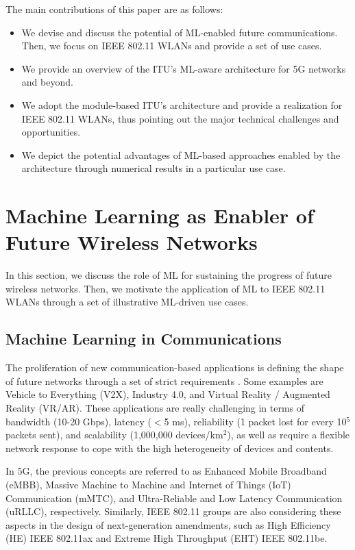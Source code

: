 \documentclass{article}
\begin{document}
The main contributions of this paper are as follows:
\begin{itemize}
	\item We devise and discuss the potential of ML-enabled future communications. Then, we focus on IEEE 802.11 WLANs and provide a set of use cases. 
	\item We provide an overview of the ITU's ML-aware architecture for 5G networks and beyond.
	\item We adopt the module-based ITU's architecture and provide a realization for IEEE 802.11 WLANs, thus pointing out the major technical challenges and opportunities.
	\item We depict the potential advantages of ML-based approaches enabled by the architecture through numerical results in a particular use case.	
\end{itemize}

\section{Machine Learning as Enabler of Future Wireless Networks} 
\label{section:intro_ML}
In this section, we discuss the role of ML for sustaining the progress of future wireless networks. Then, we motivate the application of ML to IEEE 802.11 WLANs through a set of illustrative ML-driven use cases.

\subsection{Machine Learning in Communications}
The proliferation of new communication-based applications is defining the shape of future networks through a set of strict requirements \cite{itu2019use}. Some examples are Vehicle to Everything (V2X), Industry 4.0, and Virtual Reality / Augmented Reality (VR/AR). These applications are really challenging in terms of bandwidth (10-20 Gbps), latency ($<$5 ms), reliability (1 packet lost for every 10$^5$ packets sent), and scalability (1,000,000 devices/km$^2$), as well as require a flexible network response to cope with the high heterogeneity of devices and contents.

In 5G, the previous concepts are referred to as Enhanced Mobile Broadband (eMBB), Massive Machine to Machine and Internet of Things (IoT) Communication (mMTC), and Ultra-Reliable and Low Latency Communication (uRLLC), respectively. Similarly, IEEE 802.11 groups are also considering these aspects in the design of next-generation amendments, such as High Efficiency (HE) IEEE 802.11ax and Extreme High Throughput (EHT) IEEE 802.11be.
\end{document}
